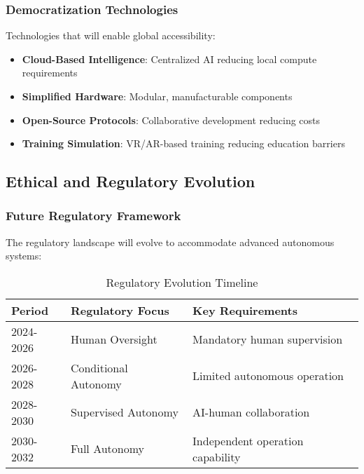 \subsubsection{Democratization Technologies}
Technologies that will enable global accessibility:

\begin{itemize}
    \item \textbf{Cloud-Based Intelligence}: Centralized AI reducing local compute requirements
    \item \textbf{Simplified Hardware}: Modular, manufacturable components
    \item \textbf{Open-Source Protocols}: Collaborative development reducing costs
    \item \textbf{Training Simulation}: VR/AR-based training reducing education barriers
\end{itemize}

\subsection{Ethical and Regulatory Evolution}

\subsubsection{Future Regulatory Framework}
The regulatory landscape will evolve to accommodate advanced autonomous systems:

\begin{table}[htbp]
\centering
\caption{Regulatory Evolution Timeline}
\label{tab:regulatory-evolution}
\begin{tabular}{|l|l|l|}
\hline
\textbf{Period} & \textbf{Regulatory Focus} & \textbf{Key Requirements} \\
\hline
2024-2026 & Human Oversight & Mandatory human supervision \\
2026-2028 & Conditional Autonomy & Limited autonomous operation \\
2028-2030 & Supervised Autonomy & AI-human collaboration \\
2030-2032 & Full Autonomy & Independent operation capability \\
\hline
\end{tabular}
\end{table}

